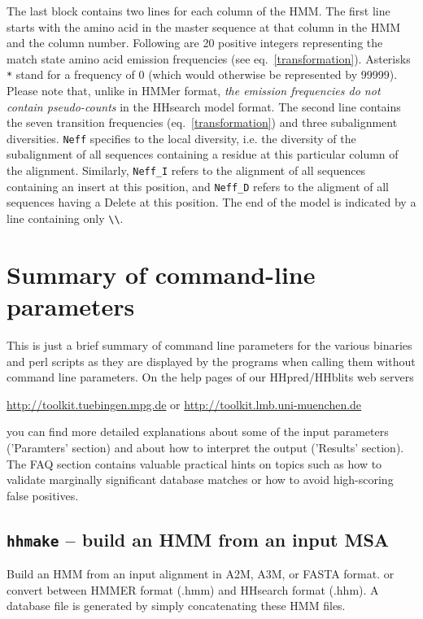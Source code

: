 \documentclass[11pt,a4paper]{article}
\begin{document}
The last block contains two lines for each column of the HMM. The first line starts with the amino acid in the master sequence at that column in the HMM and the column number. Following are 20  positive integers representing the match state amino acid emission frequencies (see eq.\ \ref{transformation}). Asterisks \verb`*` stand for a frequency of 0 (which would otherwise be represented by 99999). Please note that, unlike in HMMer format,  \emph{the emission frequencies do not contain pseudo-counts} in the HHsearch model format. The second line contains the seven transition frequencies (eq.\ \ref{transformation}) and three subalignment diversities. \verb`Neff` specifies to the local diversity, i.e. the diversity of the subalignment of all sequences containing a residue at this particular column of the alignment. Similarly, \verb`Neff_I` refers to the alignment of all sequences containing an insert at this position, and \verb`Neff_D` refers to the aligment of all sequences having a Delete at this position. The end of the model is indicated by a line containing only \verb`\\`. 

\newpage

\section{Summary of command-line parameters}

This is just a brief summary of command line parameters for the various binaries and
perl scripts as they are displayed by the programs when calling them without 
command line parameters. On the help pages of our HHpred/HHblits web servers

\url{http://toolkit.tuebingen.mpg.de} or \url{http://toolkit.lmb.uni-muenchen.de}

you can find more detailed explanations about some of the input parameters 
('Paramters' section) and about how to interpret the output ('Results' section). The FAQ 
section contains valuable practical hints on topics such as how to validate marginally
significant database matches or how to avoid high-scoring false positives.

\subsection{{\tt hhmake} -- build an HMM from an input MSA}

Build an HMM from an input alignment in A2M, A3M, or FASTA format.   
or convert between HMMER format (.hmm) and HHsearch format (.hhm).   
A database file is generated by simply concatenating these HMM files.
\end{document}
